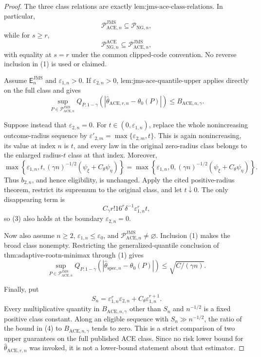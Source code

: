 \documentclass{article}
\begin{document}
\begin{proof}
The three class relations are exactly
\(\text{lem:jms-ace-class-relations}\).  In particular,
\[
 \mathcal P_{\mathrm{ACE},n}^{\mathrm{JMS}}
 \subseteq\mathcal P_{\mathrm{NG},n},                             \tag{1}
\]
while for \(s\ge r\),
\[
 \mathcal P_{\mathrm{NG},n}^{\mathrm{ACE}}
 \subseteq\mathcal P_{\mathrm{ACE},n}^{\mathrm{JMS}},            \tag{2}
\]
with equality at \(s=r\) under the common clipped-code convention.  No
reverse inclusion in (1) is used or claimed.

Assume \(\mathsf E_n^{\mathrm{JMS}}\) and
\(\varepsilon_{1,n}>0\).  If \(\varepsilon_{2,n}>0\),
\(\text{lem:jms-ace-quantile-upper}\) applies directly on the full class and
gives
\[
 \sup_{P\in\mathcal P_{\mathrm{ACE},n}^{\mathrm{JMS}}}
 Q_{P,1-\gamma}(|\widehat\theta_{\mathrm{ACE},r,n}-\theta_0(P)|)
 \le B_{\mathrm{ACE},n,\gamma}.                                  \tag{3}
\]

Suppose instead that \(\varepsilon_{2,n}=0\).  For
\(t\in(0,\varepsilon_{1,n})\), replace the whole nonincreasing outcome-radius
sequence by \(\varepsilon'_{2,m}=\max\{\varepsilon_{2,m},t\}\).  This is
again nonincreasing, its value at index \(n\) is \(t\), and every law in the
original zero-radius class belongs to the enlarged radius-\(t\) class at
that index.  Moreover,
\[
 \max\!\left\{\varepsilon_{1,n},t,
  (\gamma n)^{-1/2}(\psi_{\xi}+C_{\theta}\psi_{\eta})\right\}
 =
 \max\!\left\{\varepsilon_{1,n},0,
  (\gamma n)^{-1/2}(\psi_{\xi}+C_{\theta}\psi_{\eta})\right\}.
\]
Thus \(b_{2,n}\), and hence eligibility, is unchanged.  Apply the cited
positive-radius theorem, restrict its supremum to the original class, and
let \(t\downarrow0\).  The only disappearing term is
\[
 C_{\gamma}r!16^r\delta^{-1}\varepsilon_{1,n}^rt,
\]
so (3) also holds at the boundary \(\varepsilon_{2,n}=0\).

Now also assume \(n\ge2\),
\(\varepsilon_{1,n}\le\varepsilon_0\), and
\(\mathcal P_{\mathrm{ACE},n}^{\mathrm{JMS}}\ne\varnothing\).  Inclusion
(1) makes the broad class nonempty.  Restricting the generalized-quantile
conclusion of \(\text{thm:adaptive-rootn-minimax}\) through (1) gives
\[
 \sup_{P\in\mathcal P_{\mathrm{ACE},n}^{\mathrm{JMS}}}
 Q_{P,1-\gamma}(|\widehat\theta_{\mathrm{spec},n}-\theta_0(P)|)
 \le\sqrt{C/(\gamma n)}.                                         \tag{4}
\]

Finally, put
\[
 S_n=\varepsilon_{1,n}^r\varepsilon_{2,n}
     +C_{\theta}\varepsilon_{1,n}^{r+1}.
\]
Every multiplicative quantity in \(B_{\mathrm{ACE},n,\gamma}\) other than
\(S_n\) and \(n^{-1/2}\) is a fixed positive class constant.  Along an
eligible sequence with \(S_n\gg n^{-1/2}\), the ratio of the bound in (4)
to \(B_{\mathrm{ACE},n,\gamma}\) tends to zero.  This is a strict comparison
of two upper guarantees on the full published ACE class.  Since no risk
lower bound for \(\widehat\theta_{\mathrm{ACE},r,n}\) was invoked, it is not
a lower-bound statement about that estimator.
\end{proof}
\end{document}
